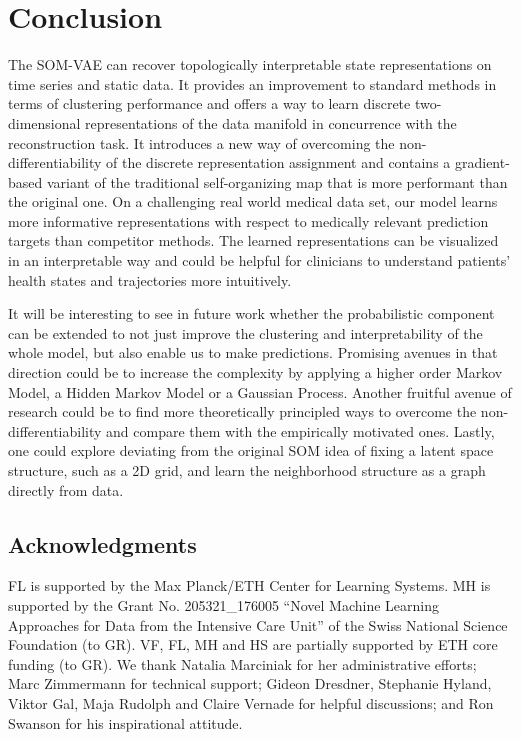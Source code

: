 \FloatBarrier

\section{Conclusion}

The SOM-VAE can recover topologically interpretable state representations on time series and static data.
It provides an improvement to standard methods in terms of clustering performance and offers a way to learn discrete two-dimensional representations of the data manifold in concurrence with the reconstruction task.
It introduces a new way of overcoming the non-differentiability of the discrete representation assignment and contains a gradient-based variant of the traditional self-organizing map that is more performant than the original one.
On a challenging real world medical data set, our model learns more informative representations with respect to medically relevant prediction targets than competitor methods.
The learned representations can be visualized in an interpretable way and could be helpful for clinicians to understand patients' health states and trajectories more intuitively.

It will be interesting to see in future work whether the probabilistic component can be extended to not just improve the clustering and interpretability of the whole model, but also enable us to make predictions.
Promising avenues in that direction could be to increase the complexity by applying a higher order Markov Model, a Hidden Markov Model or a Gaussian Process.
Another fruitful avenue of research could be to find more theoretically principled ways to overcome the non-differentiability and compare them with the empirically motivated ones.
Lastly, one could explore deviating from the original SOM idea of fixing a latent space structure, such as a 2D grid, and learn the neighborhood structure as a graph directly from data.


\subsection*{Acknowledgments}

FL is supported by the Max Planck/ETH Center for Learning Systems.
MH is supported by the Grant No. 205321\_176005 ``Novel Machine Learning Approaches for Data from the Intensive Care
Unit'' of the Swiss National Science Foundation (to GR).
VF, FL, MH and HS are partially supported by ETH core funding (to GR).
We thank Natalia Marciniak for her administrative efforts; Marc Zimmermann for technical support; Gideon Dresdner, Stephanie Hyland, Viktor Gal, Maja Rudolph and Claire Vernade for helpful discussions; and Ron Swanson for his inspirational attitude.
\beginsupplement

